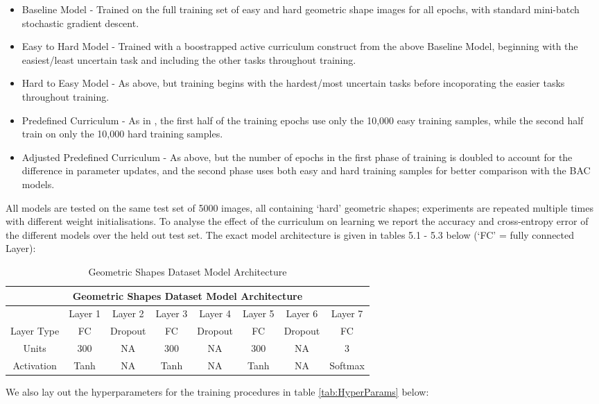  \begin{itemize}
 \item Baseline Model - Trained on the full training set of easy and hard geometric shape images for all epochs, with standard mini-batch stochastic gradient descent.
 \item Easy to Hard Model - Trained with a boostrapped active curriculum construct from the above Baseline Model, beginning with the easiest/least uncertain task and including the other tasks throughout training.
 \item Hard to Easy Model - As above, but training begins with the hardest/most uncertain tasks before incoporating the easier tasks throughout training.
 \item Predefined Curriculum - As in \cite{Bengio2009}, the first half of the training epochs use only the 10,000 easy training samples, while the second half train on only the 10,000 hard training samples.
 \item Adjusted Predefined Curriculum - As above, but the number of epochs in the first phase of training is doubled to account for the difference in parameter updates, and the second phase uses both easy and hard training samples for better comparison with the BAC models.
 \end{itemize}
 
All models are tested on the same test set of 5000 images, all containing `hard' geometric shapes; experiments are repeated multiple times with different weight initialisations. To analyse the effect of the curriculum on learning we report the accuracy and cross-entropy error of the different models over the held out test set. The exact model architecture is given in tables 5.1 - 5.3 below (`FC' = fully connected Layer):
 
\begin{table}[h]
\caption{Geometric Shapes Dataset Model Architecture} \label{tab:GeoArchitecture}
\begin{tabular}{|c||c|c|c|c|c|c|c|}
\hline
\multicolumn{8}{|c|}{Geometric Shapes Dataset Model Architecture} \\
\hline
 & Layer 1 & Layer 2 & Layer 3& Layer 4 &Layer 5 & Layer 6 & Layer 7 \\
\hline
Layer Type & FC & Dropout & FC & Dropout & FC & Dropout  & FC \\
\hline
Units & 300 & NA & 300 & NA & 300 & NA & 3 \\
\hline
Activation & Tanh \footnotemark & NA & Tanh & NA & Tanh & NA & Softmax \\
\hline
\end{tabular}
\end{table}
We also lay out the hyperparameters for the training procedures in table \ref{tab:HyperParams} below:

